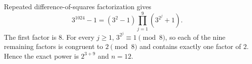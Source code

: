 Repeated difference-of-squares factorization gives
\[
3^{1024}-1=(3^2-1)\prod_{j=1}^{9}(3^{2^j}+1).
\]
The first factor is $8$. For every $j\ge1$, $3^{2^j}\equiv1\pmod8$, so each of the nine remaining factors is congruent to $2\pmod8$ and contains exactly one factor of $2$. Hence the exact power is $2^{3+9}$ and $\boxed{n=12}$.
